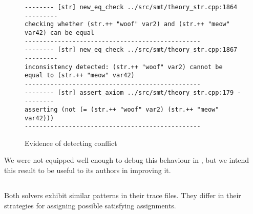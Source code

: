         \begin{figure}[h]
            {\scriptsize\begin{verbatim}
-------- [str] new_eq_check ../src/smt/theory_str.cpp:1864 ---------
checking whether (str.++ "woof" var2) and (str.++ "meow" var42) can be equal
------------------------------------------------
-------- [str] new_eq_check ../src/smt/theory_str.cpp:1867 ---------
inconsistency detected: (str.++ "woof" var2) cannot be equal to (str.++ "meow" var42)
------------------------------------------------
-------- [str] assert_axiom ../src/smt/theory_str.cpp:179 ---------
asserting (not (= (str.++ "woof" var2) (str.++ "meow" var42)))
------------------------------------------------\end{verbatim}}
            \caption{Evidence of \us{} detecting conflict}
            \label{fig:z3str3-conflict}
        \end{figure}

        We were not equipped well enough to debug this behaviour in \cvc{}, but we intend this result to be useful to its authors in improving it.

    \subsection{\zHard{}}

        Both solvers exhibit similar patterns in their trace files. They differ in their strategies for assigning possible satisfying assignments.

